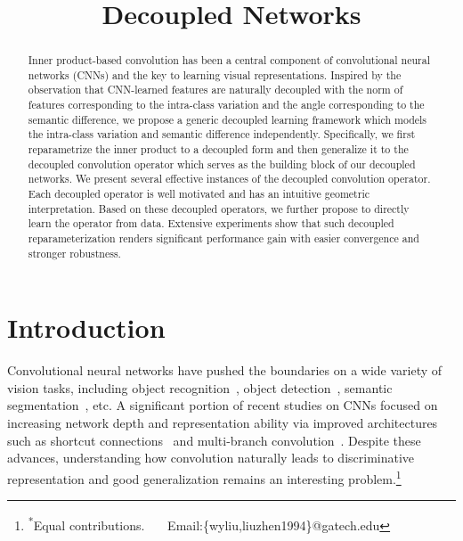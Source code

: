 \title{Decoupled Networks}

\begin{abstract}
Inner product-based convolution has been a central component of convolutional neural networks (CNNs) and the key to learning visual representations. Inspired by the observation that CNN-learned features are naturally decoupled with the norm of features corresponding to the intra-class variation and the angle corresponding to the semantic difference, we propose a generic decoupled learning framework which models the intra-class variation and semantic difference independently. Specifically, we first reparametrize the inner product to a decoupled form and then generalize it to the decoupled convolution operator which serves as the building block of our decoupled networks. We present several effective instances of the decoupled convolution operator. Each decoupled operator is well motivated and has an intuitive geometric interpretation. Based on these decoupled operators, we further propose to directly learn the operator from data. Extensive experiments show that such decoupled reparameterization renders significant performance gain with easier convergence and stronger robustness.
\end{abstract}

\section{Introduction}
Convolutional neural networks have pushed the boundaries on a wide variety of vision tasks, including object recognition~\cite{simonyan2014very,szegedy2015going,he2016deep}, object detection~\cite{girshick2015fast,ren2015faster,redmon2016you}, semantic segmentation~\cite{long2015fully}, etc. A significant portion of recent studies on CNNs focused on increasing network depth and representation ability via improved architectures such as shortcut connections~\cite{he2016deep,huang2017densely} and multi-branch convolution~\cite{szegedy2015going,xie2017aggregated}. Despite these advances, understanding how convolution naturally leads to discriminative representation and good generalization remains an interesting problem.\footnote{\textsuperscript{*}Equal contributions. \ \ \ Email:\{wyliu,liuzhen1994\}@gatech.edu}

\setcounter{footnote}{0}
\renewcommand\thefootnote{\arabic{footnote}}

